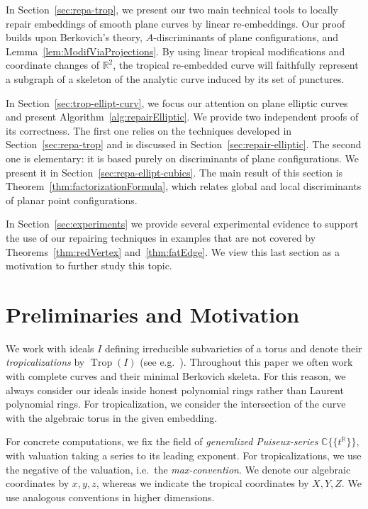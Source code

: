 \documentclass[11pt]{amsart}
\numberwithin{equation}{section}
\theoremstyle{plain}
\theoremstyle{definition}
\theoremstyle{remark}
\begin{document}
In Section~\ref{sec:repa-trop}, we present our two main technical
tools to locally repair embeddings of smooth plane curves by linear
re-embeddings. Our proof builds upon Berkovich's theory,
$A$-discriminants of plane configurations, and
Lemma~\ref{lem:ModifViaProjections}. By using linear tropical
modifications and coordinate changes of ${\mathbb{R}}^2$, the tropical
re-embedded curve will faithfully represent a subgraph of a skeleton
of the analytic curve induced by its set of punctures.

In Section~\ref{sec:trop-ellipt-curv}, we focus our attention on plane
elliptic curves and present Algorithm~\ref{alg:repairElliptic}.  We
provide two independent proofs of its correctness.  The first one
relies on the techniques developed in Section~\ref{sec:repa-trop} and
is discussed in Section~\ref{sec:repair-elliptic}. The second one is
elementary: it is based purely on discriminants of plane
configurations.  We present it in
Section~\ref{sec:repa-ellipt-cubics}. The main result of this section
is Theorem~\ref{thm:factorizationFormula}, which relates global and
local discriminants of planar point configurations.

In Section~\ref{sec:experiments} we provide several experimental
evidence to support the use of our repairing techniques in examples
that are not covered by Theorems~\ref{thm:redVertex}
and~\ref{thm:fatEdge}. We view this last section as a motivation to
further study this topic.

\section{Preliminaries and Motivation}\label{sec:prel-motiv}
We work with ideals $I$ defining irreducible subvarieties of a torus
and denote their \emph{tropicalizations} by $\operatorname{Trop}(I)$ (see
e.g.~\cite{MS09}).  Throughout this paper we often work with complete
curves and their minimal Berkovich skeleta. For this reason, we always
consider our ideals inside honest polynomial rings rather than Laurent
polynomial rings. For tropicalization, we consider the intersection of
the curve with the algebraic torus in the given embedding.

For concrete computations, we fix the field of \emph{generalized
  Puiseux-series} ${{\mathbb{C}}\{\!\{t^{\mathbb{R}}\}\!\}}$, with valuation taking a series to its
leading exponent. For tropicalizations, we use the negative of the
valuation, i.e.\ the \emph{max-convention}. We denote our algebraic
coordinates by $x,y,z$, whereas we indicate the tropical coordinates
by $X,Y,Z$. We use analogous conventions in higher dimensions.
\end{document}
